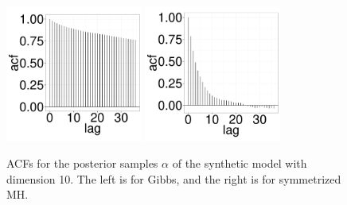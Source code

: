 {  \begin{figure}[H]
  \centering
  \begin{minipage}[!hp]{0.99\linewidth}
    \includegraphics [width=0.40\textwidth, angle=0]{figs/EXP_ks/exp_gbsacf_44_05_10_.pdf}
	\hspace{.5in}
    \includegraphics [width=0.40\textwidth, angle=0]{figs/EXP_ks/exp_mhacf_44_05_10_.pdf}
  \end{minipage}

    \caption{ACFs for the posterior samples $\alpha$ of the synthetic model with dimension 10. The left is for Gibbs, and the right is for symmetrized MH.}
     \label{fig:ACF_EXP}
  \end{figure}

}
